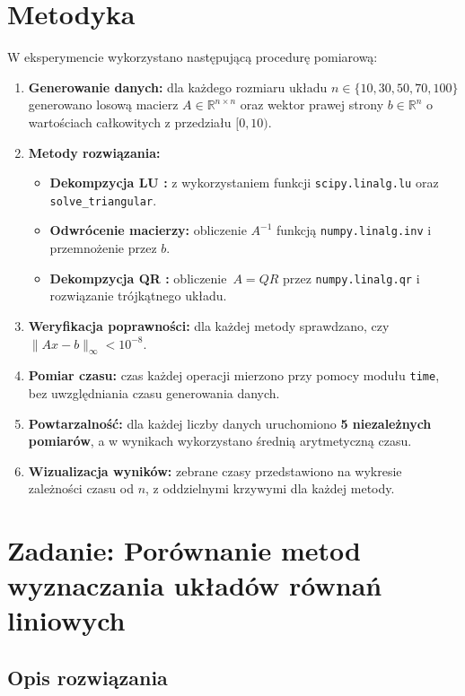 \documentclass[a4paper,12pt]{article}
\begin{document}
\section{Metodyka}

W eksperymencie wykorzystano następującą procedurę pomiarową:
\begin{enumerate}
  \item {\bf Generowanie danych:} dla każdego rozmiaru układu \(n\in\{10,30,50,70,100\}\) generowano losową macierz \(A\in\mathbb{R}^{n\times n}\) oraz wektor prawej strony \(b\in\mathbb{R}^n\) o wartościach całkowitych z przedziału \([0,10)\).
  \item {\bf Metody rozwiązania:}
    \begin{itemize}
      \item \textbf{Dekompzycja LU \cite{wiki:Metoda_LU}:} z wykorzystaniem funkcji \texttt{scipy.linalg.lu} oraz \texttt{solve\_triangular}.
      \item \textbf{Odwrócenie macierzy:} obliczenie \(A^{-1}\) funkcją \texttt{numpy.linalg.inv} i przemnożenie przez \(b\).
      \item \textbf{Dekompzycja QR \cite{wiki:Rozkład_QR}:} obliczenie \(\,A=QR\) przez \texttt{numpy.linalg.qr} i rozwiązanie trójkątnego układu.
    \end{itemize}
  \item {\bf Weryfikacja poprawności:} dla każdej metody sprawdzano, czy \(\|Ax - b\|_\infty < 10^{-8}\).
  \item {\bf Pomiar czasu:} czas każdej operacji mierzono przy pomocy modułu \texttt{time}, bez uwzględniania czasu generowania danych.
  \item {\bf Powtarzalność:} dla każdej liczby danych uruchomiono \textbf{5 niezależnych pomiarów}, a w wynikach wykorzystano średnią arytmetyczną czasu.
  \item {\bf Wizualizacja wyników:} zebrane czasy przedstawiono na wykresie zależności czasu od \(n\), z oddzielnymi krzywymi dla każdej metody.
\end{enumerate}

\section{Zadanie: Porównanie metod wyznaczania układów równań liniowych}

\subsection{Opis rozwiązania}
\end{document}
